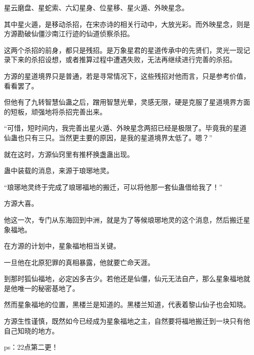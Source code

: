 \begin{this_body}
星云磨盘、星蛇索、六幻星身、位星移、星火遁、外映星念。

其中星火遁，是移动杀招，在宋亦诗的相关行动中，大放光彩。而外映星念，则是方源勘破仙僵沙南江行迹的仙道侦察杀招。

这两个杀招的前身，都只是残招。是万象星君的星道传承中的先贤们，灵光一现记录下来的杀招设想，或者推算过程中遭遇失败，无法再继续进行完善的杀招。

方源的星道境界只是普通，若是寻常情况下，这些残招对他而言，只是参考价值，看看罢了。

但他有了九转智慧仙蛊之后，蹭用智慧光晕，灵感无限，硬是克服了星道境界方面的短板，顽强地将杀招完善出来。

“可惜，短时间内，我完善出星火遁、外映星念两招已经是极限了。毕竟我的星道仙蛊也只有三只。当然更主要的原因，是我的星道境界太低了。嗯？”

就在这时，方源仙窍里有推杯换盏蛊出现。

蛊中装载的消息，来源于琅琊地灵。

“琅琊地灵终于完成了琅琊福地的搬迁，可以将他那一套仙蛊借给我了！”

方源大喜。

他这一次，专门从东海回到中洲，就是为了等候琅琊地灵的这个消息，然后搬迁星象福地。

在方源的计划中，星象福地相当关键。

一旦他在北原犯罪的真相暴露，他就要亡命天涯。

到那时狐仙福地，必定凶多吉少。若他还是仙僵，仙元无法自产，那么星象福地就是他唯一的秘密基地了。

然而星象福地的位置，黑楼兰是知道的。黑楼兰知道，代表着黎山仙子也会知晓。

方源生性谨慎，既然如今已经成为星象福地之主，自然要将福地搬迁到一块只有他自己知晓的地方。

ps：22点第二更！

\end{this_body}

